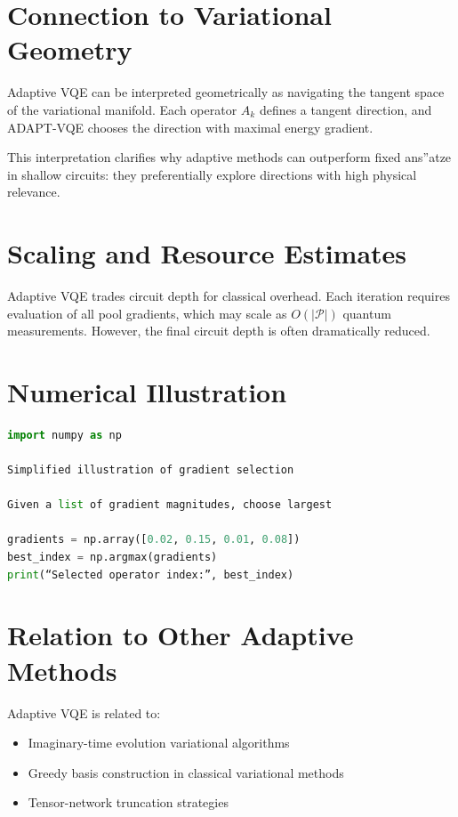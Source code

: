 \documentclass{book}
\begin{document}
\section{Connection to Variational Geometry}

Adaptive VQE can be interpreted geometrically as navigating the tangent space of the variational manifold. Each operator $A_k$ defines a tangent direction, and ADAPT-VQE chooses the direction with maximal energy gradient.

This interpretation clarifies why adaptive methods can outperform fixed ans”atze in shallow circuits: they preferentially explore directions with high physical relevance.

\section{Scaling and Resource Estimates}

Adaptive VQE trades circuit depth for classical overhead. Each iteration requires evaluation of all pool gradients, which may scale as $O(|\mathcal{P}|)$ quantum measurements. However, the final circuit depth is often dramatically reduced.

\section{Numerical Illustration}

\begin{lstlisting}[language=Python]
import numpy as np

Simplified illustration of gradient selection

Given a list of gradient magnitudes, choose largest

gradients = np.array([0.02, 0.15, 0.01, 0.08])
best_index = np.argmax(gradients)
print(“Selected operator index:”, best_index)
\end{lstlisting}

\section{Relation to Other Adaptive Methods}

Adaptive VQE is related to:
\begin{itemize}
\item Imaginary-time evolution variational algorithms
\item Greedy basis construction in classical variational methods
\item Tensor-network truncation strategies
\end{itemize}
\end{document}
